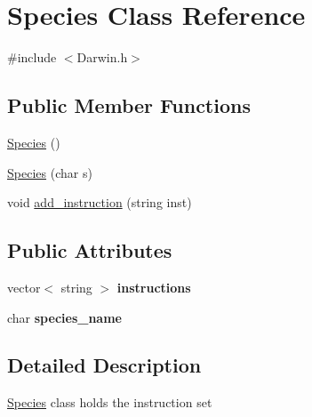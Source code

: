 \hypertarget{classSpecies}{\section{\-Species \-Class \-Reference}
\label{classSpecies}
}


{\ttfamily \#include $<$\-Darwin.\-h$>$}

\subsection*{\-Public \-Member \-Functions}
\begin{DoxyCompactItemize}
\item 
\hyperlink{classSpecies_abb0f8e3208b0cc676157b7dff837c0be}{\-Species} ()
\item 
\hyperlink{classSpecies_a6c84b1451176aa61f42c4562ef845090}{\-Species} (char s)
\item 
void \hyperlink{classSpecies_a2578012dea60323f75b03a65dc7ba54e}{add\-\_\-instruction} (string inst)
\end{DoxyCompactItemize}
\subsection*{\-Public \-Attributes}
\begin{DoxyCompactItemize}
\item 
\hypertarget{classSpecies_a2967f1f40745dd4f0b35f837cfaa33a6}{vector$<$ string $>$ {\bfseries instructions}}\label{classSpecies_a2967f1f40745dd4f0b35f837cfaa33a6}

\item 
\hypertarget{classSpecies_a73dc7acd63ae01dbb7e2115e7e20a1de}{char {\bfseries species\-\_\-name}}\label{classSpecies_a73dc7acd63ae01dbb7e2115e7e20a1de}

\end{DoxyCompactItemize}


\subsection{\-Detailed \-Description}
\hyperlink{classSpecies}{\-Species} class holds the instruction set 

